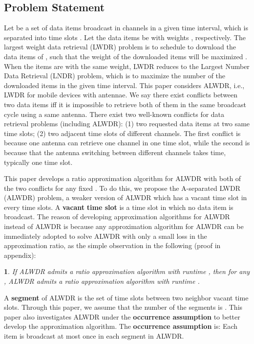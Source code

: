 \documentclass[11pt,english,onecolumn,draftcls]{IEEEtran}
\theoremstyle{plain}
\theoremstyle{plain}
\newtheorem{prop}[thm]{\protect\propositionname}
\theoremstyle{plain}
\theoremstyle{plain}
\providecommand{\propositionname}{Proposition}
\begin{document}
\subsection{Problem Statement}

Let  be a set of data items
broadcast in channels  in a given
time interval, which is separated into time slots .
Let the data items  be with weights
, respectively. The largest weight data retrieval
(LWDR) problem is to schedule to download the data items of ,
such that the weight of the downloaded items will be maximized \cite{Infocom12LuEfficient}.
When the items are with the same weight, LWDR reduces to the Largest
Number Data Retrieval (LNDR) problem, which is to maximize the number
of the downloaded items in the given time interval. This paper considers
ALWDR, i.e., LWDR for mobile devices with  antennae.
We say there exist conflicts between two data items iff it is impossible
to retrieve both of them in the same broadcast cycle using a same
antenna. There exist two well-known conflicts for data retrieval problems
(including ALWDR): (1) two requested data items at two same
time slots; (2) two adjacent time slots of different channels. The
first conflict is because one antenna can retrieve one channel in
one time slot, while the second is because that the antenna switching
between different channels takes time, typically one time slot.

This paper develops a ratio  approximation
algorithm for ALWDR with both of the two conflicts for any
fixed . To do this, we propose the A-separated
LWDR (ALWDR) problem, a weaker version of ALWDR
which has a vacant time slot in every  time slots. A \textbf{vacant}
\textbf{time slot} is a time slot in which no data item is broadcast.
The reason of developing approximation algorithms for ALWDR
instead of ALWDR is because any approximation algorithm for
ALWDR can be immediately adopted to solve ALWDR
with only a small loss in the approximation ratio, as the simple observation
in the following (proof in appendix):
\begin{prop}
\label{prop:simpobsbetw-gamma}If ALWDR admits a
ratio  approximation algorithm with runtime ,
then for any , ALWDR admits a ratio 
approximation algorithm with runtime .
\end{prop}
A \textbf{segment} of ALWDR is the set of time slots
between two neighbor vacant time slots. Through this paper, we assume
that the number of the segments is . This paper also investigates
ALWDR under the \textbf{occurrence assumption} to
better develop the approximation algorithm. The \textbf{occurrence
assumption} is: Each item is broadcast at most once in each segment
in ALWDR.
\end{document}
